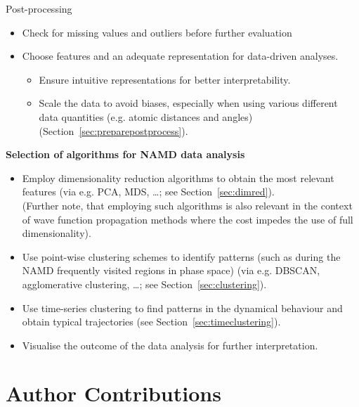 \documentclass[9pt,bestpractices]{livecoms}
\begin{document}
\begin{Checklists*}[p!]
\begin{checklist}{Post-processing}
\begin{itemize}
\item Check for missing values and outliers before further evaluation
\item Choose features and an adequate representation for data-driven analyses.
\begin{itemize}
\item Ensure intuitive representations for better interpretability.
\item Scale the data to avoid biases, especially when using various different data quantities (e.g. atomic distances and angles) (Section~\ref{sec:preparepostprocess}).
\end{itemize}
\end{itemize}
\textbf{Selection of algorithms for NAMD data analysis}
\begin{itemize}
\item Employ dimensionality reduction algorithms to obtain the most relevant features (via e.g. PCA, MDS, \dots; see Section~\ref{sec:dimred}). \\(Further note, that employing such algorithms is also relevant in the context of wave function propagation methods where the cost impedes the use of full dimensionality).
\item Use point-wise clustering schemes to identify patterns (such as during the NAMD frequently visited regions in phase space) (via e.g. DBSCAN, agglomerative clustering, \dots; see Section~\ref{sec:clustering}).
\item Use time-series clustering to find patterns in the dynamical behaviour and obtain typical trajectories (see Section~\ref{sec:timeclustering}).
\item Visualise the outcome of the data analysis for further interpretation.
\end{itemize}
\end{checklist}

\end{Checklists*}

\clearpage

\section*{Author Contributions}
%
\end{document}
